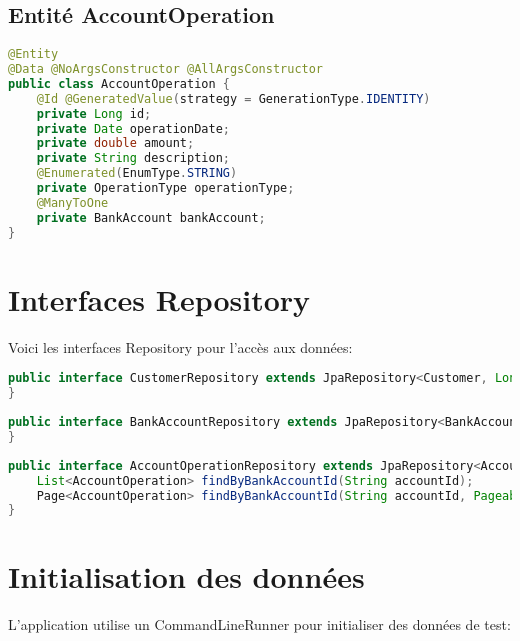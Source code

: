 \documentclass[12pt,a4paper]{report}
\begin{document}
\subsection{Entité AccountOperation}
\begin{lstlisting}[language=Java, caption=Entité AccountOperation.java]
@Entity
@Data @NoArgsConstructor @AllArgsConstructor
public class AccountOperation {
    @Id @GeneratedValue(strategy = GenerationType.IDENTITY)
    private Long id;
    private Date operationDate;
    private double amount;
    private String description;
    @Enumerated(EnumType.STRING)
    private OperationType operationType;
    @ManyToOne
    private BankAccount bankAccount;
}
\end{lstlisting}

\section{Interfaces Repository}
Voici les interfaces Repository pour l'accès aux données:

\begin{lstlisting}[language=Java, caption=CustomerRepository.java]
public interface CustomerRepository extends JpaRepository<Customer, Long> {
}
\end{lstlisting}

\begin{lstlisting}[language=Java, caption=BankAccountRepository.java]
public interface BankAccountRepository extends JpaRepository<BankAccount, String> {
}
\end{lstlisting}

\begin{lstlisting}[language=Java, caption=AccountOperationRepository.java]
public interface AccountOperationRepository extends JpaRepository<AccountOperation, Long> {
    List<AccountOperation> findByBankAccountId(String accountId);
    Page<AccountOperation> findByBankAccountId(String accountId, Pageable pageable);
}
\end{lstlisting}

\section{Initialisation des données}
L'application utilise un CommandLineRunner pour initialiser des données de test:
\end{document}
